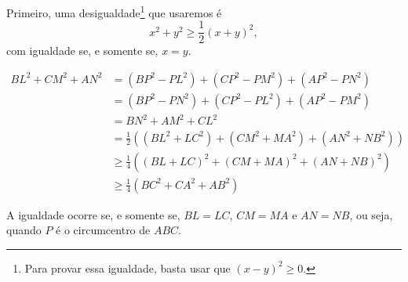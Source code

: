 Primeiro, uma desigualdade\footnote{Para provar essa igualdade, basta usar que $(x-y)^2 \geq 0$.} que usaremos é
\begin{equation*}
	x^2 + y^2 \geq \frac{1}{2}(x+y)^2,
\end{equation*}
com igualdade se, e somente se, $x=y$.

\begin{align*}
	BL^2 + CM^2 + AN^2 	&= (BP^2 - PL^2) + (CP^2 - PM^2) + (AP^2 - PN^2)\\
						&= (BP^2 - PN^2) + (CP^2 - PL^2) + (AP^2 - PM^2)\\
						&= BN^2 + AM^2 + CL^2\\
						&= \frac{1}{2}\left((BL^2 + LC^2) + (CM^2 + MA^2) + (AN^2 + NB^2)\right)\\
						&\geq \frac{1}{4}\left((BL + LC)^2 + (CM + MA)^2 + (AN + NB)^2\right)\\
						&\geq \frac{1}{4}\left(BC^2 + CA^2 + AB^2\right)
\end{align*}

A igualdade ocorre se, e somente se, $BL = LC$, $CM = MA$ e $AN = NB$, ou seja, quando $P$ é o circumcentro de $ABC$.

